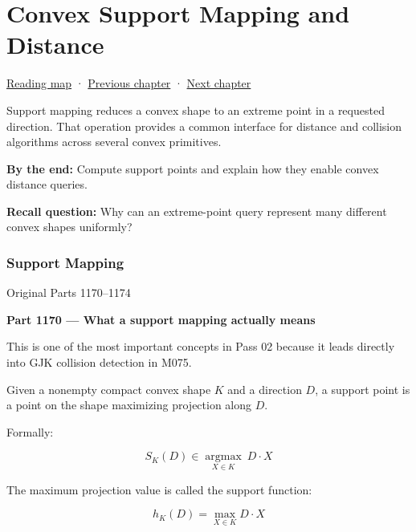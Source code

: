 \chapter{Convex Support Mapping and Distance}\label{04-visual-computing-ii-ch022-convex-support-mapping-and-distance}\hypertarget{04-visual-computing-ii-ch022}{}\label{stagechapter:04-visual-computing-ii-ch022}

\hypertarget{04-visual-computing-ii-ch022-convex-support-mapping-and-distance}{}

\hyperref[volume-reading-map]{Reading map} · \hyperref[03-visual-computing-i-ch021-collision-implementations-and-repository-comparison]{Previous chapter} · \hyperref[04-visual-computing-ii-ch023-mesh-topology-and-connectivity]{Next chapter}

Support mapping reduces a convex shape to an extreme point in a requested direction. That operation provides a common interface for distance and collision algorithms across several convex primitives.

\textbf{By the end:} Compute support points and explain how they enable convex distance queries.

\textbf{Recall question:} Why can an extreme-point query represent many different convex shapes uniformly?

\subsection{Support Mapping}\label{04-visual-computing-ii-ch022-support-mapping}

\hypertarget{04-visual-computing-ii-ch022-support-mapping}{}

Original Parts 1170--1174

\textbf{Part 1170 --- What a support mapping actually means}

This is one of the most important concepts in Pass 02 because it leads directly into GJK collision detection in M075.

Given a nonempty compact convex shape \(K\) and a direction \(D\), a support point is a point on the shape maximizing projection along \(D\).

Formally:

\[
\boxed{ S_K(D)\in \underset{X\in K}{\operatorname{argmax}} \ D\cdot X }
\]

The maximum projection value is called the support function:

\[
\boxed{ h_K(D)=\max_{X\in K}D\cdot X }
\]

